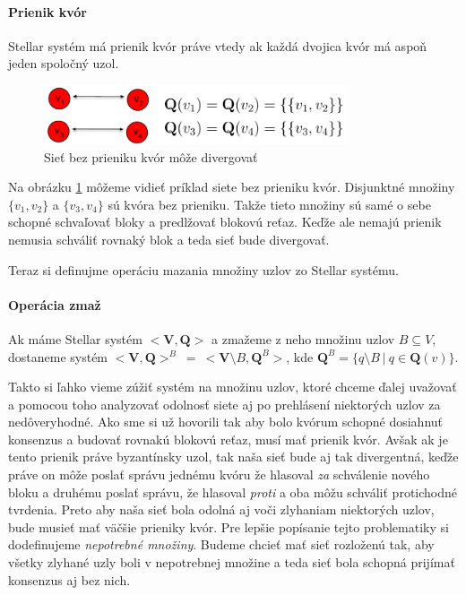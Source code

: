 \paragraph {Prienik kvór} Stellar systém má prienik kvór práve vtedy ak každá
dvojica kvór má aspoň jeden spoločný uzol.

\begin{figure}
\centerline{\includegraphics[width=0.8\textwidth]{images/prienik_kvor.pdf}}
\caption[Príklad siete bez prieniku kvór]{Sieť bez prieniku kvór môže
divergovať} \label{obr:prienik_kvor} \end{figure}

\vspace{4mm}
Na obrázku \ref{obr:prienik_kvor} môžeme vidieť príklad siete bez prieniku kvór.
Disjunktné množiny $\{v_1, v_2\}$ a $\{v_3, v_4\}$ sú kvóra bez prieniku. Takže
tieto množiny sú samé o sebe schopné schvaľovať bloky a predlžovať blokovú
reťaz.
Keďže ale nemajú prienik nemusia schváliť rovnaký blok a teda sieť bude
divergovať.

Teraz si definujme operáciu mazania množiny uzlov zo Stellar systému.

\paragraph {Operácia zmaž} Ak máme Stellar systém $<\textbf{V},\textbf{Q}>$ a
zmažeme z neho množinu uzlov $B \subseteq V$, dostaneme systém $<\textbf{V},
\textbf{Q}>^B \: = \: <\textbf{V} \setminus B,\textbf{Q}^B>$, kde $\textbf{Q}^B
= \{q \setminus B \: | \: q \in \textbf{Q}(v)\}$.

\vspace{5mm}
Takto si ľahko vieme zúžiť systém na množinu uzlov, ktoré chceme ďalej uvažovať
a pomocou toho analyzovať odolnosť siete aj po prehlásení niektorých uzlov
za nedôveryhodné. Ako sme si už hovorili tak aby bolo kvórum schopné dosiahnuť
konsenzus a budovať rovnakú blokovú reťaz, musí mať prienik kvór. Avšak ak je
tento prienik práve byzantínsky uzol, tak naša sieť bude aj tak divergentná,
keďže práve on môže poslať správu jednému kvóru že hlasoval \textit{za} schválenie
nového bloku a druhému poslať správu, že hlasoval \textit{proti} a oba môžu schváliť
protichodné tvrdenia. Preto aby naša sieť bola odolná aj voči zlyhaniam niektorých
uzlov, bude musieť mať väčšie prieniky kvór.
Pre lepšie popísanie tejto problematiky si dodefinujeme \textit{nepotrebné množiny}.
Budeme chcieť mať sieť rozloženú tak, aby všetky zlyhané uzly boli v
nepotrebnej množine a teda sieť bola schopná prijímať konsenzus aj bez nich.

